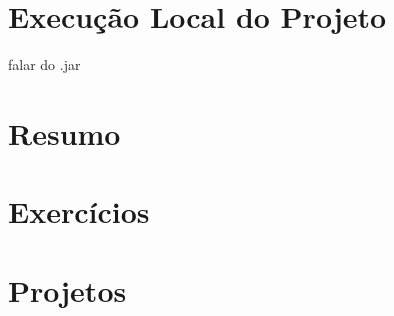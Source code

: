 
\section{Execução Local do Projeto}

falar do .jar


\section{Resumo}

\section{Exercícios}

\section{Projetos}
